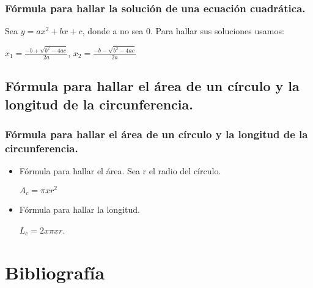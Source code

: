 \documentclass{beamer}
\begin{document}
\begin{frame}
\frametitle{Fórmula para hallar la solución de una ecuación cuadrática.}
  Sea $y= ax^2 + bx + c$, donde a no sea 0.
  Para hallar sus soluciones usamos:\newline
  \begin{center}
  $x_1 = \frac{-b+\sqrt{b^{2}-4ac}}{2a}$, $x_2 = \frac{-b-\sqrt{b^{2}-4ac}}{2a}$
  \end{center}
\end{frame}

  \subsection{Fórmula para hallar el área de un círculo y la longitud de la circunferencia.}

\begin{frame}
\frametitle{Fórmula para hallar el área de un círculo y la longitud de la circunferencia.}
  \begin{itemize}
  \item
  Fórmula para hallar el área.\newline
  Sea r el radio del círculo.
  \begin{center}
$A_c = \pi x r^2$
  \end{center}
  
  \item
  Fórmula para hallar la longitud.\newline
  \begin{center}
  $L_c = 2 x \pi x r$. 
  \end{center}
\end{itemize}
\end{frame}

\section{Bibliografía}
\end{document}
